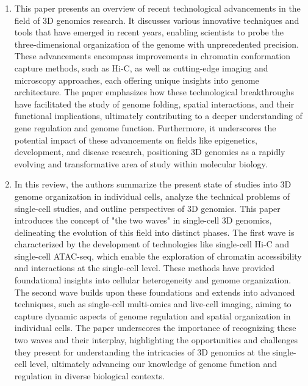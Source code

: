 \begin{enumerate}
    \item This paper presents an overview of recent technological advancements in the field of 3D genomics research. It discusses various innovative techniques and tools that have emerged in recent years, enabling scientists to probe the three-dimensional organization of the genome with unprecedented precision. These advancements encompass improvements in chromatin conformation capture methods, such as Hi-C, as well as cutting-edge imaging and microscopy approaches, each offering unique insights into genome architecture. The paper emphasizes how these technological breakthroughs have facilitated the study of genome folding, spatial interactions, and their functional implications, ultimately contributing to a deeper understanding of gene regulation and genome function. Furthermore, it underscores the potential impact of these advancements on fields like epigenetics, development, and disease research, positioning 3D genomics as a rapidly evolving and transformative area of study within molecular biology.
    \item In this review, the authors summarize the present state of studies into 3D genome organization in individual cells, analyze the technical problems of single-cell studies, and outline perspectives of 3D genomics. This paper introduces the concept of "the two waves" in single-cell 3D genomics, delineating the evolution of this field into distinct phases. The first wave is characterized by the development of technologies like single-cell Hi-C and single-cell ATAC-seq, which enable the exploration of chromatin accessibility and interactions at the single-cell level. These methods have provided foundational insights into cellular heterogeneity and genome organization. The second wave builds upon these foundations and extends into advanced techniques, such as single-cell multi-omics and live-cell imaging, aiming to capture dynamic aspects of genome regulation and spatial organization in individual cells. The paper underscores the importance of recognizing these two waves and their interplay, highlighting the opportunities and challenges they present for understanding the intricacies of 3D genomics at the single-cell level, ultimately advancing our knowledge of genome function and regulation in diverse biological contexts.
\end{enumerate}